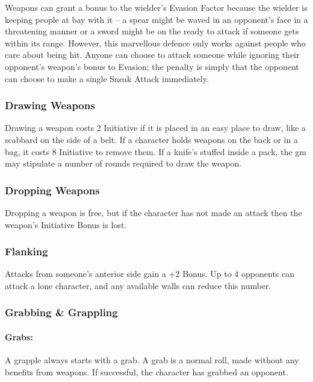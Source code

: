 \begin{multicols}{2}
Weapons can grant a bonus to the wielder's Evasion Factor because the wielder is keeping people at bay with it -- a spear might be waved in an opponent's face in a threatening manner or a sword might be on the ready to attack if someone gets within its range.
However, this marvellous defence only works against people who care about being hit.
Anyone can choose to attack someone while ignoring their opponent's weapon's bonus to Evasion; the penalty is simply that the opponent can choose to make a single Sneak Attack immediately.

\subsubsection{Drawing Weapons}

Drawing a weapon costs 2 Initiative if it is placed in an easy place to draw, like a scabbard on the side of a belt. If a character holds weapons on the back or in a bag, it costs 8 Initiative to remove them. If a knife's stuffed inside a pack, the \gls{gm} may stipulate a number of \glspl{round} required to draw the weapon.

\subsubsection{Dropping Weapons}

Dropping a weapon is free, but if the character has not made an attack then the weapon's Initiative Bonus is lost.

\subsubsection{Flanking}\label{flank}

Attacks from someone's anterior side gain a +2 Bonus.
Up to 4 opponents can attack a lone character, and any available walls can reduce this number.

\subsubsection{Grabbing \& Grappling}

\paragraph{Grabs:}

A grapple always starts with a grab.  A grab is a normal roll, made without any benefits from weapons.  If successful, the character has grabbed an opponent.


\end{multicols}
